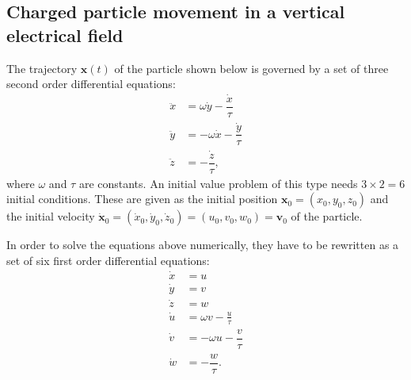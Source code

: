 \documentclass[
  fontsize=11pt,
  english,
  BCOR=10mm,DIV=12,
  bibliography=totoc,
  parskip=false,
  headings=small,
  headinclude=false,
  footinclude=false,
  twoside=false,
  UKenglish
]{pst-doc}
\begin{document}
\subsection[Charged particle movement in a vertical electrical field]{Charged particle movement in a vertical electrical field }
The trajectory $\mathbf{x}(t)$ of the particle shown below is governed by a set of three second order differential equations:
\begin{subequations}
\begin{align}
\ddot{x} &= \omega\dot{y}-\dfrac{\dot{x}}{\tau}\\
\ddot{y} &= -\omega\dot{x}-\dfrac{\dot{y}}{\tau}\\
\ddot{z} &= -\dfrac{\dot{z}}{\tau},
\end{align}
\end{subequations}
where $\omega$ and $\tau$ are constants. An initial value problem of this type needs $3\times2=6$ initial conditions. These are given as the initial position $\mathbf{x}_0=(x_0, y_0, z_0)$ and the initial velocity $\dot{\mathbf{x}}_0=(\dot{x}_0, \dot{y}_0, \dot{z}_0)=(u_0, v_0, w_0) = \mathbf{v}_0$ of the particle.

In order to solve the equations above numerically, they have to be rewritten as a set of six first order differential equations:
\begin{subequations}
\begin{align}
\dot{x} &= u\\
\dot{y} &= v\\
\dot{z} &= w\\
\dot{u} &= \omega v-\frac{u}{\tau}\\
\dot{v} &= -\omega u-\dfrac{v}{\tau}\\
\dot{w} &= -\dfrac{w}{\tau}.
\end{align}
\end{subequations}
\end{document}
